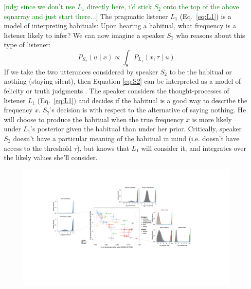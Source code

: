 \documentclass[10pt,letterpaper]{article}
\newcommand{\ndg}[1]{\textcolor{Green}{[ndg: #1]}}
\begin{document}
\ndg{since we don't use $L_1$ directly here, i'd stick $S_2$ onto the top of the above eqnarray and just start there...}
The pragmatic listener $L_1$ (Eq.~\ref{eq:L1}) is a model of interpreting habituals: Upon hearing a habitual, what frequency is a listener likely to infer?
We can now imagine a speaker $S_2$ who reasons about this type of listener: 
%
\begin{equation} 
P_{S_{2}}(u \mid x) \propto  \int_{\theta} P_{L_{1}}(x , \tau \mid u)
\label{eq:S2}
\end{equation}
%
If we take the two utterances considered by speaker $S_2$ to be the habitual or nothing (staying silent), then Equation \ref{eq:S2} can be interpreted as a model of felicity or truth judgments \cite{Degen2014, TesslerUnderReview}.
The speaker considers the thought-processes of listener $L_1$ (Eq.~\ref{eq:L1}) and decides if the habitual is a good way to describe the frequency $x$. 
$S_2$'s decision is with respect to the alternative of saying nothing. 
He will choose to produce the habitual when the true frequency $x$ is more likely under $L_1$'s posterior given the habitual than under her prior. 
Critically, speaker $S_{2}$ doesn't have a particular meaning of the habitual in mind (i.e. doesn't have access to the threshold $\tau$), but knows that $L_{1}$ will consider it, and integrates over the likely values she'll consider.


\begin{figure}[t]
\centering
  \includegraphics[width=\textwidth]{prior-scatter-insets}
  \caption{}
  \label{fig:priorScatter}
\end{figure}
%
\end{document}
